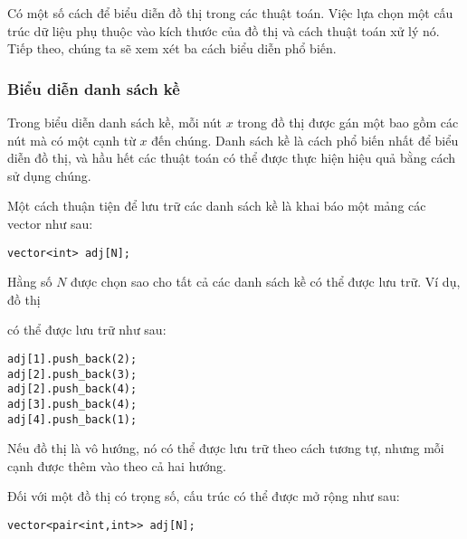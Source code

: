 Có một số cách để biểu diễn đồ thị
trong các thuật toán.
Việc lựa chọn một cấu trúc dữ liệu
phụ thuộc vào kích thước của đồ thị và
cách thuật toán xử lý nó.
Tiếp theo, chúng ta sẽ xem xét ba cách biểu diễn phổ biến.

\subsubsection{Biểu diễn danh sách kề}


Trong biểu diễn danh sách kề,
mỗi nút $x$ trong đồ thị được gán một 
bao gồm các nút
mà có một cạnh từ $x$ đến chúng.
Danh sách kề là cách phổ biến nhất
để biểu diễn đồ thị, và hầu hết các thuật toán có thể được
thực hiện hiệu quả bằng cách sử dụng chúng.

Một cách thuận tiện để lưu trữ các danh sách kề là khai báo
một mảng các vector như sau:
\begin{lstlisting}
vector<int> adj[N];
\end{lstlisting}

Hằng số $N$ được chọn sao cho tất cả
các danh sách kề có thể được lưu trữ.
Ví dụ, đồ thị

\begin{center}
\end{center}
có thể được lưu trữ như sau:
\begin{lstlisting}
adj[1].push_back(2);
adj[2].push_back(3);
adj[2].push_back(4);
adj[3].push_back(4);
adj[4].push_back(1);
\end{lstlisting}

Nếu đồ thị là vô hướng, nó có thể được lưu trữ theo cách tương tự,
nhưng mỗi cạnh được thêm vào theo cả hai hướng.

Đối với một đồ thị có trọng số, cấu trúc có thể được mở rộng
như sau:

\begin{lstlisting}
vector<pair<int,int>> adj[N];
\end{lstlisting}


